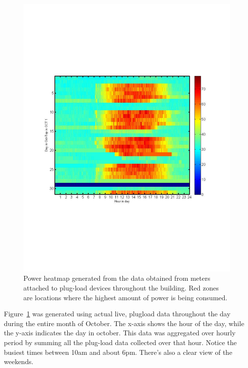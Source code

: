 \begin{figure}[htb!]
\begin{center}
\includegraphics[scale=0.49]{figs/Aggregate_SDH_OCT_PLUG_LOADS}
\caption{Power heatmap generated from the data obtained from meters attached to plug-load devices throughout the building.  
Red zones are locations where the highest amount of power is being consumed.}
\label{fig:plugloadheatmap}
\end{center}
\end{figure}

Figure~\ref{fig:plugloadheatmap} was generated using actual live, plugload data throughout the day during the entire month
of October.  The x-axis shows the hour of the day, while the y-axis indicates the day in october.  This data was aggregated
over hourly period by summing all the plug-load data collected over that hour.  Notice the busiest times between 10am and 
about 6pm.  There's also a clear view of the weekends.



